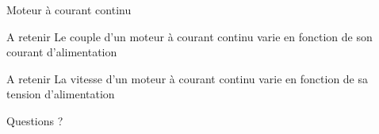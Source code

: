 \documentclass{beamer}
\begin{document}
\begin{frame}{Moteur à courant continu}
  \begin{alertblock}{A retenir}
    Le couple d'un moteur à courant continu varie en fonction de son courant d'alimentation
  \end{alertblock}

  \begin{alertblock}{A retenir}
    La vitesse d'un moteur à courant continu varie en fonction de sa tension d'alimentation
  \end{alertblock}
\end{frame}

    \begin{frame}[focus]
        Questions ?
    \end{frame}

    \appendix
\end{document}
